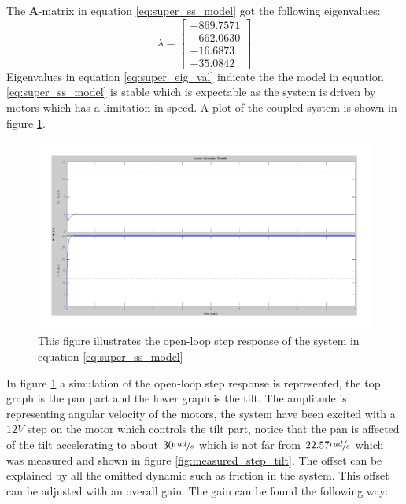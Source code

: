 The \textbf{A}-matrix in equation \ref{eq:super_ss_model} got the following eigenvalues:
\begin{equation}
 \lambda =
 \begin{bmatrix}
   - 869.7571\\
   - 662.0630\\
   - 16.6873\\
   - 35.0842
 \end{bmatrix}\label{eq:super_eig_val}
\end{equation}
Eigenvalues in equation \ref{eq:super_eig_val} indicate the the model in equation \ref{eq:super_ss_model} is stable which is expectable as the system is driven by motors which has a limitation in speed. A plot of the coupled system is shown in figure \ref{fig:good_step}.
\begin{figure}[htb]
	\begin{center}
	\includegraphics[scale=1,trim=0 0 0 0]{graphics/GoodSim.pdf} %
	\caption{This figure illustrates the open-loop step response of the system in equation \ref{eq:super_ss_model}}
	\label{fig:good_step}			%
	\end{center}
\end{figure}
In figure \ref{fig:good_step} a simulation of the open-loop step response is represented, the top graph is the pan part and the lower graph is the tilt. The amplitude is representing angular velocity of the motors, the system have been excited with a $12V$ step on the motor which controls the tilt part, notice that the pan is affected of the tilt accelerating to about $30\sfrac{rad}{s}$ which is not far from $22.57\sfrac{rad}{s}$ which was measured and shown in figure \ref{fig:measured_step_tilt}. The offset can be explained by all the omitted dynamic such as friction in the system. This offset can be adjusted with an overall gain. The gain can be found the following way:
